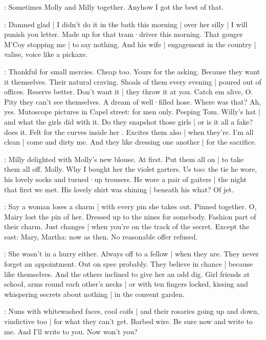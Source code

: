 \BloomHist:
Sometimes Molly and Milly together.
Anyhow I got the best of that.

\BloomToday:
Damned glad |
I didn't do it in the bath this morning |
over her silly |
I will punish you letter.
Made up for that tram·driver this morning.
That gouger M'Coy stopping me |
to say nothing.
And his wife |
engagement in the country |
valise,
voice like a pickaxe.

\BloomAbstract:
Thankful for small mercies.
Cheap too.
Yours for the asking.%
Because they want it themselves.
Their natural craving.
Shoals of them every evening |
poured out of offices.
Reserve better.
Don't want it |
they throw it at you.
Catch em alive,
O.
Pity they can't see themselves.
A dream of well·filled hose.
Where was that?
Ah,
yes.
Mutoscope pictures in Capel street:
for men only.
Peeping Tom.
Willy's hat |
and what the girls did with it.
Do they snapshot those girls |
or is it all a fake?
 does it.
Felt for the curves inside her .
Excites them also |
when they're.
I'm all clean |
come and dirty me.
And they like dressing one another |
for the sacrifice.

\BloomHist:
Milly delighted with Molly's new blouse.
At first.
Put them all on |
to take them all off.
Molly.
Why I bought her the violet garters.%
Us too:
the tie he wore,
his lovely socks and turned·up trousers.
He wore a pair of gaiters |
the night that first we met.
His lovely shirt was shining |
beneath his what?
Of jet.

\BloomAbstract:
Say a woman loses a charm |
with every pin she takes out.
Pinned together.
O,
Mairy lost the pin of her.
Dressed up to the nines for somebody.
Fashion part of their charm.
Just changes |
when you're on the track of the secret.
Except the east:
Mary,
Martha:
now as then.
No reasonable offer refused.

\BloomCurrent:
She wasn't in a hurry either.
Always off to a fellow |
when they are.
They never forget an appointment.
Out on spec probably.
They believe in chance |
because like themselves.
And the others inclined to give her an odd dig.
Girl friends at school,
arms round each other's necks |%
or with ten fingers locked,
kissing and whispering secrets about nothing |
in the convent garden.

\BloomAbstract:
Nuns with whitewashed faces,
cool coifs |
and their rosaries
going up and down,
vindictive too |
for what they can't get.
Barbed wire.
Be sure now and write to me.
And I'll write to you.
Now won't you?

